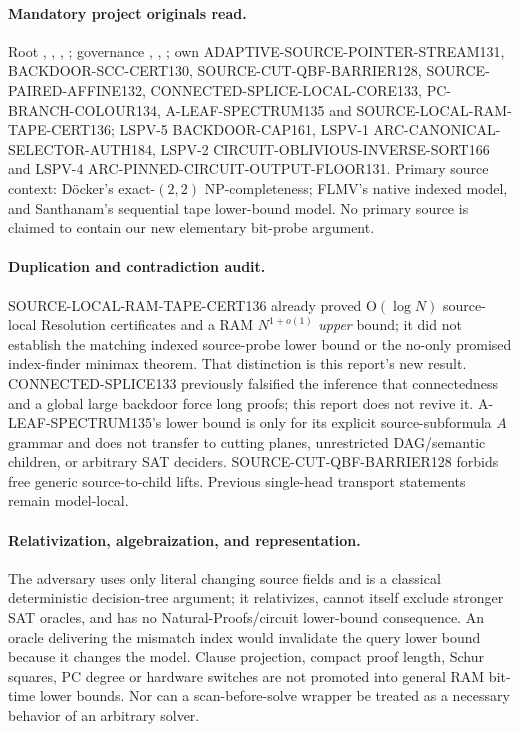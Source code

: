 \documentclass[11pt]{article}
\begin{document}
\paragraph{Mandatory project originals read.}
Root , , ,
;
governance ,
,
;
own ADAPTIVE-SOURCE-POINTER-STREAM131, BACKDOOR-SCC-CERT130,
SOURCE-CUT-QBF-BARRIER128, SOURCE-PAIRED-AFFINE132,
CONNECTED-SPLICE-LOCAL-CORE133, PC-BRANCH-COLOUR134,
A-LEAF-SPECTRUM135 and SOURCE-LOCAL-RAM-TAPE-CERT136;
LSPV-5 BACKDOOR-CAP161, LSPV-1
ARC-CANONICAL-SELECTOR-AUTH184, LSPV-2
CIRCUIT-OBLIVIOUS-INVERSE-SORT166 and LSPV-4
ARC-PINNED-CIRCUIT-OUTPUT-FLOOR131.
Primary source context: D\"ocker's exact-$(2,2)$ NP-completeness;
FLMV's native indexed model, and Santhanam's sequential tape
lower-bound model. No primary source is claimed to contain our new
elementary bit-probe argument.

\paragraph{Duplication and contradiction audit.}
SOURCE-LOCAL-RAM-TAPE-CERT136 already proved O$(\log N)$
source-local Resolution certificates and a RAM
$N^{1+o(1)}$ \emph{upper} bound; it did not establish the matching
indexed source-probe lower bound or the no-only promised index-finder
minimax theorem. That distinction is this report's new result.
CONNECTED-SPLICE133 previously falsified the inference
that connectedness and a global large backdoor force long proofs;
this report does not revive it. A-LEAF-SPECTRUM135's lower
bound is only for its explicit source-subformula $A$ grammar and
does not transfer to cutting planes, unrestricted DAG/semantic
children, or arbitrary SAT deciders. SOURCE-CUT-QBF-BARRIER128
forbids free generic source-to-child lifts.
Previous single-head transport statements remain model-local.

\paragraph{Relativization, algebraization, and representation.}
The adversary uses only literal changing source fields and is a
classical deterministic decision-tree argument; it relativizes,
cannot itself exclude stronger SAT oracles, and has no
Natural-Proofs/circuit lower-bound consequence. An oracle delivering
the mismatch index would invalidate the query lower bound because
it changes the model. Clause projection, compact proof length,
Schur squares, PC degree or hardware switches are not promoted
into general RAM bit-time lower bounds. Nor can a scan-before-solve
wrapper be treated as a necessary behavior of an arbitrary solver.
\end{document}
